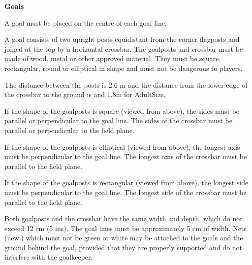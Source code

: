 \bigskip

{\bfseries Goals }

\headlinebox

A goal must be placed on the centre of each goal line.


\bigskip

A goal consists of two upright posts equidistant from the corner flagposts and joined at the top by a horizontal crossbar. The goalposts and crossbar must be made of wood, metal or other approved material. They must be square, rectangular, round or elliptical in shape and must
not be dangerous to players.

\bigskip

The distance between the posts is 2.6 m and the distance from the lower edge of
the crossbar to the ground is  and 1.8m for AdultSize. 


\bigskip


\bigskip


\bigskip

If the shape of the goalposts is square (viewed from above), the sides must be parallel or perpendicular to the goal line. The sides of the crossbar must be parallel or perpendicular to the field plane.

\bigskip

If the shape of the goalposts is elliptical (viewed from above), the longest axis must be perpendicular to the goal line. The longest axis of the crossbar must be parallel to the field plane.

\bigskip

If the shape of the goalposts is rectangular (viewed from above), the longest side must be perpendicular to the goal line. The longest side of the crossbar must be parallel to the field plane.

\bigskip

Both goalposts and the crossbar have the same width and depth,
which  do not exceed 12 cm (5 ins).
The goal lines must be approximately 5 cm of width. 
Nets (new:) which must not be green or white may be attached to the goals and the ground behind the goal, provided that they are properly supported and do not interfere with the goalkeeper. 

